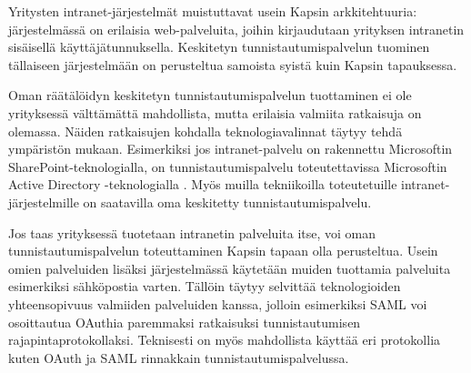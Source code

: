Yritysten intranet-järjestelmät muistuttavat usein Kapsin arkkitehtuuria: järjestelmässä on erilaisia web-palveluita, joihin kirjaudutaan yrityksen intranetin sisäisellä käyttäjätunnuksella. Keskitetyn tunnistautumispalvelun tuominen tällaiseen järjestelmään on perusteltua samoista syistä kuin Kapsin tapauksessa.

Oman räätälöidyn keskitetyn tunnistautumispalvelun tuottaminen ei ole yrityksessä välttämättä mahdollista, mutta erilaisia valmiita ratkaisuja on olemassa. Näiden ratkaisujen kohdalla teknologiavalinnat täytyy tehdä ympäristön mukaan. Esimerkiksi jos intranet-palvelu on rakennettu Microsoftin SharePoint-teknologialla, on tunnistautumispalvelu toteutettavissa Microsoftin Active Directory -teknologialla \cite{sharepoint}. Myös muilla tekniikoilla toteutetuille intranet-järjestelmille on saatavilla oma keskitetty tunnistautumispalvelu.

Jos taas yrityksessä tuotetaan intranetin palveluita itse, voi oman tunnistautumispalvelun toteuttaminen Kapsin tapaan olla perusteltua. Usein omien palveluiden lisäksi järjestelmässä käytetään muiden tuottamia palveluita esimerkiksi sähköpostia varten. Tällöin täytyy selvittää teknologioiden yhteensopivuus valmiiden palveluiden kanssa, jolloin esimerkiksi SAML voi osoittautua OAuthia paremmaksi ratkaisuksi tunnistautumisen rajapintaprotokollaksi. Teknisesti on myös mahdollista käyttää eri protokollia kuten OAuth ja SAML rinnakkain tunnistautumispalvelussa.